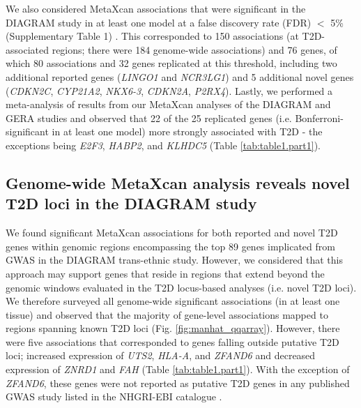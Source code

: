 \documentclass[10pt]{article}
\begin{document}
We also considered MetaXcan associations that were significant in the DIAGRAM study in at least one model at a false discovery rate (FDR) $< $ 5\%  (Supplementary Table 1) . This corresponded to 150  associations (at T2D-associated regions; there were 184 genome-wide associations) and 76 genes, of which 80 associations and 32 genes replicated at this threshold, including  two additional reported genes (\textit{LINGO1} and \textit{NCR3LG1}) and 5 additional novel genes (\textit{CDKN2C}, \textit{CYP21A2}, \textit{NKX6-3}, \textit{CDKN2A}, \textit{P2RX4}). Lastly, we performed a meta-analysis of  results from our MetaXcan analyses of the DIAGRAM and GERA studies and observed that 22 of the 25 replicated genes (i.e. Bonferroni-significant in at least one model) more strongly associated with T2D - the exceptions being \textit{E2F3}, \textit{HABP2}, and \textit{KLHDC5} (Table \ref{tab:table1.part1}).	

\subsection*{Genome-wide MetaXcan analysis reveals novel T2D loci in the DIAGRAM study}

We found significant MetaXcan associations for both reported and novel T2D genes within genomic regions encompassing the top 89 genes implicated from GWAS in the DIAGRAM trans-ethnic study. However, we considered that this approach may support genes that reside in regions that extend beyond the genomic windows evaluated in the T2D locus-based analyses (i.e. novel T2D loci). We therefore surveyed all genome-wide significant associations (in at least one tissue) and observed that the majority of gene-level associations mapped to regions spanning known T2D loci (Fig. \ref{fig:manhat_qqarray}). However, there were five associations that corresponded to genes falling outside putative T2D loci; increased expression of \textit{UTS2}, \textit{HLA-A}, and \textit{ZFAND6} and decreased expression of \textit{ZNRD1} and \textit{FAH} (Table \ref{tab:table1.part1}). With the exception of \textit{ZFAND6}, these genes were not reported as putative T2D genes in any published GWAS study listed in the NHGRI-EBI catalogue \cite{Voight2010a}. 
\end{document}
